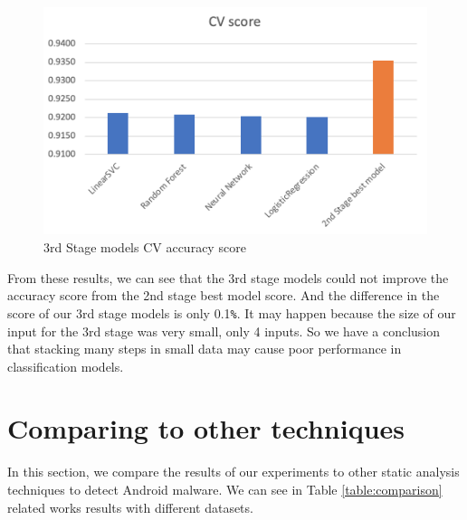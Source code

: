     \begin{figure}[htbp]
        \centering
        \includegraphics[scale=0.6]{./Figure/3rdstage.png}
        \caption{3rd Stage models CV accuracy score}
        \label{fig:3rdstage}
      \end{figure}

From these results, we can see that the 3rd stage models could not improve the accuracy score from the 2nd stage best model score. And the difference in the score of our 3rd stage models is only 0.1\verb+%+. It may happen because the size of our input for the 3rd stage was very small, only 4 inputs. So we have a conclusion that stacking many steps in small data may cause poor performance in classification models.


\section{Comparing to other techniques}

In this section, we compare the results of our experiments to other static analysis techniques to detect Android malware. We can see in Table \ref{table:comparison} related works results with different datasets.


